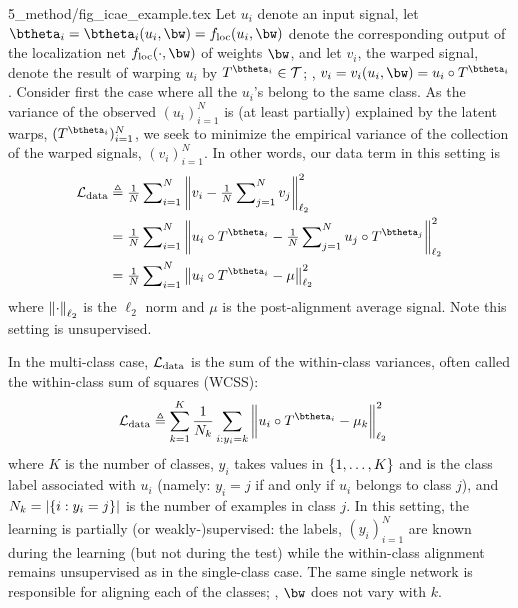 {5_method/fig_icae_example.tex}
Let $u_i$ denote an input signal, let 
$\btheta_i=\btheta_i(u_i,\bw)=
f_{\mathrm{loc}}(u_i,\bw)$
denote the corresponding output of the localization net $f_{\mathrm{loc}}(\cdot,\bw)$
of weights $\bw$,
and let $v_i$, the warped signal, 
denote the result of warping $u_i$ by $T^{\btheta_i}\in\Tcal$;
\ie, $v_i = v_i(u_i,\bw) = u_i \circ T^{\btheta_i}$.
%
Consider first the case where all the $u_i$'s belong to the same class.
As the variance of the observed $(u_i)_{i=1}^N$ is (at least partially) explained by the latent warps, $(T^{\btheta_i})_{i=1}^N$, 
we seek to minimize the empirical variance of the collection of the warped signals, $(v_i)_{i=1}^N$.
In other words, our data term in this setting is
\begin{align}
\label{eqn:alinment_loss}
 \Lcal_{\mathrm{data}} 
 &\triangleq \tfrac{1}{N} \sum\nolimits_{i=1}^{N} \ellTwoNorm{v_i - \tfrac{1}{N}\sum\nolimits_{j=1}^{N}v_j}^{2} \nonumber \\
 &= \tfrac{1}{N} \sum\nolimits_{i=1}^{N} \ellTwoNorm{u_i \circ T^{\btheta_i} - \tfrac{1}{N}\sum\nolimits_{j=1}^N u_j \circ T^{\btheta_j}}^{2} 
 \nonumber \\  &
 = \tfrac{1}{N} \sum\nolimits_{i=1}^{N} \ellTwoNorm{u_i \circ T^{\btheta_i} - \mu}^{2} \nonumber \\
\end{align}
where  ${{\left\|\cdot\right\|}}_{\ell_2}$ is the $\ell_2$ norm and $\mu$ is the post-alignment average signal.
Note this setting is unsupervised. 

In the multi-class case, $\mathcal{L}_{\mathrm{data}}$ is the sum of the within-class variances, often
called the within-class sum of squares (WCSS):
\begin{align}
\Lcal_{\mathrm{data}} &\triangleq \sum_{k=1}^K 
 \frac{1}{N_k}\sum_{i:y_i=k} \bigg\|u_i \circ T^{\btheta_i} -   \mu_k \bigg\|_{\ell _2}^{2}
\end{align}
where $K$ is the number of classes, $y_i$ takes values in ${\{1,\ldots,K\}}$
and is the class label associated with $u_i$ (namely: $y_i=j$ if and only if $u_i$ belongs to class $j$), and $N_k=
|{\{i:y_i=j\}}|$ is the number of examples in class $j$.
In this setting, the learning is partially (or weakly-)supervised: 
the labels, $(y_i)_{i=1}^N$ are known during the learning (but not during the test)
 while the within-class alignment remains unsupervised as in the single-class case. 
The same single network is responsible for aligning 
 each of the classes; \ie, $\bw$ does not vary with $k$. 


